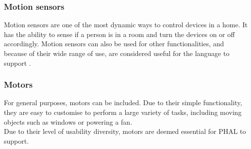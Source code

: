\subsubsection{Motion sensors}
Motion sensors are one of the most dynamic ways to control devices in a home. It has the ability to sense if a person is in a room and turn the devices on or off accordingly. Motion sensors can also be used for other functionalities, and because of their wide range of use, are considered useful for the language to support \cite{BenefitsAndRisksOfSmartHomeTechnologies}.

\subsubsection{Motors}
For general purposes, motors can be included. Due to their simple functionality, they are easy to customise to perform a large variety of tasks, including moving objects such as windows or powering a fan.\\
Due to their level of usability diversity, motors are deemed essential for PHAL to support.

